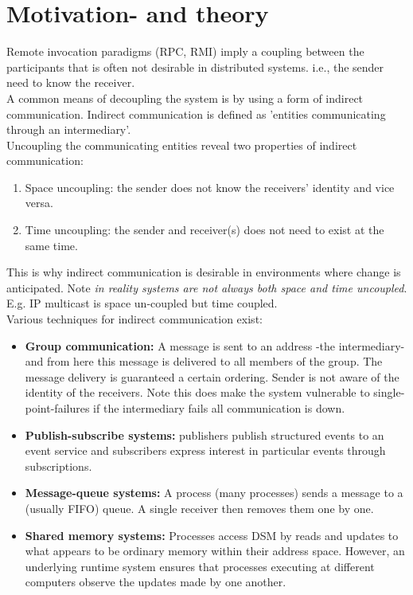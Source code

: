 \section{Motivation- and theory}
\label{jgroup_motivation}
Remote invocation paradigms (RPC, RMI) imply a coupling between the participants that is often not desirable in distributed systems. i.e., the sender need to know the receiver. \\

A common means of decoupling the system is by using a form of indirect communication. Indirect communication is defined as 'entities communicating through an intermediary'.\\
 
Uncoupling the communicating entities reveal two properties of indirect communication: 

\begin{enumerate}
\item Space uncoupling: the sender does not know the receivers' identity and vice versa. 
\item Time uncoupling: the sender and receiver(s) does not need to exist at the same time.  
\end{enumerate}

This is why indirect communication is desirable in environments where change is anticipated. Note \textit{in reality systems are not always both space and time uncoupled}. E.g. IP multicast is space un-coupled but time coupled. \\

Various techniques for indirect communication exist:\\

\begin{itemize}
\item \textbf{Group communication:} A message is sent to an address -the intermediary-  and from here this message is delivered to all members of the group. The message delivery is guaranteed a certain ordering. Sender is not aware of the identity of the receivers. Note this does make the system vulnerable to single-point-failures if the intermediary fails all communication is down. \\

\item \textbf{Publish-subscribe systems:} publishers publish structured events to an event service and subscribers express interest in particular events through  subscriptions. \\

\item \textbf{Message-queue systems:} A process (many processes) sends a message to a (usually FIFO) queue. A single receiver then removes them one by one.\\

\item \textbf{Shared memory systems:} Processes access DSM by reads and updates to what appears to be ordinary memory within their address space. However, an underlying runtime system ensures that processes executing at different computers observe the updates made by one another.\\
\end{itemize}

